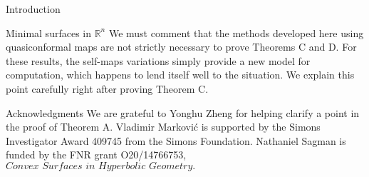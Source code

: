 \documentclass[10pt]{amsart}
\newcommand{\R}{\mathbb R}
\theoremstyle{definition}
\begin{document}
\begin{section}{Introduction}
\begin{subsection}{Minimal surfaces in $\R^n$}
We must comment that the methods developed here using quasiconformal maps are not strictly necessary to prove Theorems C and D. For these results, the self-maps variations simply provide a new model for computation, which happens to lend itself well to the situation. We explain this point carefully right after proving Theorem C.
\end{subsection}



\begin{subsection}{Acknowledgments}
We are grateful to Yonghu Zheng for helping clarify a point in the proof of Theorem A. Vladimir Markovi{\'c} is supported by the Simons Investigator Award 409745 from the Simons Foundation. Nathaniel Sagman is funded by the FNR grant O20/14766753, $\textit{Convex Surfaces in Hyperbolic Geometry.}$
\end{subsection}
\end{section}
\end{document}
